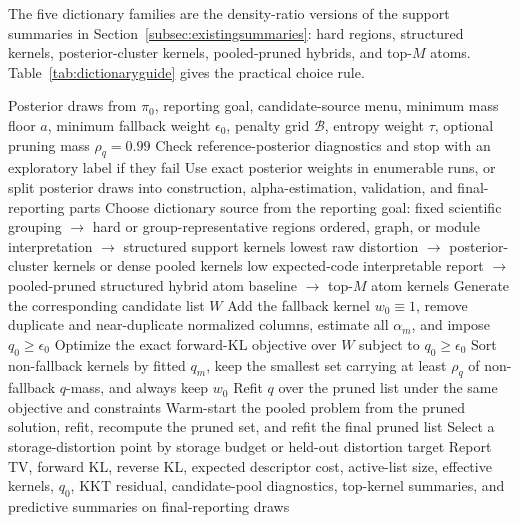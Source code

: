 \documentclass[twoside,11pt]{article}
\begin{document}
The five dictionary families are the density-ratio versions of the support summaries in Section~\ref{subsec:existingsummaries}: hard regions, structured kernels, posterior-cluster kernels, pooled-pruned hybrids, and top-\(M\) atoms. Table~\ref{tab:dictionaryguide} gives the practical choice rule.

\begin{algorithm}[H]
\caption{Density-ratio posterior compression with selectable dictionaries}
\label{alg:adaptivekernels}
\begin{algorithmic}[1]
\Require Posterior draws from \(\pi_0\), reporting goal, candidate-source menu, minimum mass floor \(a\), minimum fallback weight \(\epsilon_0\), penalty grid \(\mathcal B\), entropy weight \(\tau\), optional pruning mass \(\rho_q=0.99\)
\State Check reference-posterior diagnostics and stop with an exploratory label if they fail
\State Use exact posterior weights in enumerable runs, or split posterior draws into construction, alpha-estimation, validation, and final-reporting parts
\State Choose dictionary source from the reporting goal:
\Statex \hspace{\algorithmicindent}fixed scientific grouping \(\to\) hard or group-representative regions
\Statex \hspace{\algorithmicindent}ordered, graph, or module interpretation \(\to\) structured support kernels
\Statex \hspace{\algorithmicindent}lowest raw distortion \(\to\) posterior-cluster kernels or dense pooled kernels
\Statex \hspace{\algorithmicindent}low expected-code interpretable report \(\to\) pooled-pruned structured hybrid
\Statex \hspace{\algorithmicindent}atom baseline \(\to\) top-\(M\) atom kernels
\State Generate the corresponding candidate list \(W\)
\State Add the fallback kernel \(w_0\equiv1\), remove duplicate and near-duplicate normalized columns, estimate all \(\alpha_m\), and impose \(q_0\ge\epsilon_0\)
    \State Optimize the exact forward-KL objective over \(W\) subject to \(q_0\ge\epsilon_0\)
        \State Sort non-fallback kernels by fitted \(q_m\), keep the smallest set carrying at least \(\rho_q\) of non-fallback \(q\)-mass, and always keep \(w_0\)
        \State Refit \(q\) over the pruned list under the same objective and constraints
        \State Warm-start the pooled problem from the pruned solution, refit, recompute the pruned set, and refit the final pruned list
    \EndIf
\EndFor
\State Select a storage-distortion point by storage budget or held-out distortion target
\State Report TV, forward KL, reverse KL, expected descriptor cost, active-list size, effective kernels, \(q_0\), KKT residual, candidate-pool diagnostics, top-kernel summaries, and predictive summaries on final-reporting draws
\end{algorithmic}
\end{algorithm}
\end{document}
